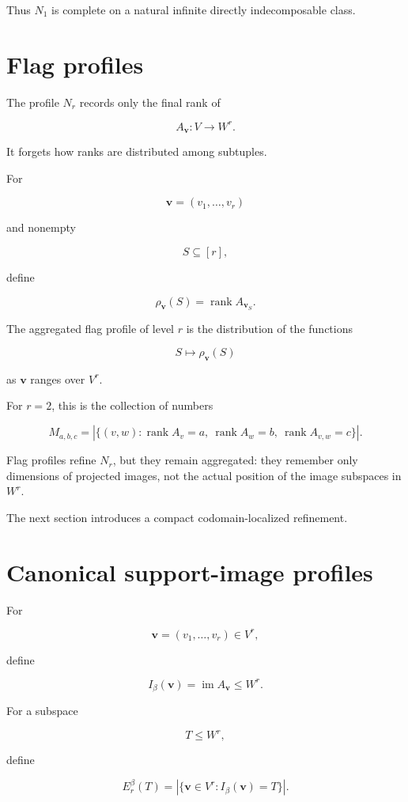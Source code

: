 \documentclass[11pt]{article}
\begin{document}
Thus $N_1$ is complete on a natural infinite directly indecomposable class.

\section{Flag profiles}

The profile $N_r$ records only the final rank of

\[
A_{\mathbf v}:V\to W^r.
\]

It forgets how ranks are distributed among subtuples.

For

\[
\mathbf v=(v_1,\dots,v_r)
\]

and nonempty

\[
S\subseteq [r],
\]

define

\[
\rho_{\mathbf v}(S)
=\operatorname{rank}A_{\mathbf v_S}.
\]

The aggregated flag profile of level $r$ is the distribution of the functions

\[
S\mapsto \rho_{\mathbf v}(S)
\]

as $\mathbf v$ ranges over $V^r$.

For $r=2$, this is the collection of numbers

\[
M_{a,b,c}
=|\{(v,w):
\operatorname{rank}A_v=a,\
\operatorname{rank}A_w=b,\
\operatorname{rank}A_{v,w}=c
\}|.
\]

Flag profiles refine $N_r$, but they remain aggregated: they remember only dimensions of projected images, not the actual position of the image subspaces in $W^r$.

The next section introduces a compact codomain-localized refinement.

\section{Canonical support-image profiles}

For

\[
\mathbf v=(v_1,\dots,v_r)\in V^r,
\]

define

\[
I_\beta(\mathbf v)=\operatorname{im}A_{\mathbf v}\le W^r.
\]

For a subspace

\[
T\le W^r,
\]

define

\[
E_r^\beta(T)
=|\{\mathbf v\in V^r:I_\beta(\mathbf v)=T\}|.
\]
\end{document}
